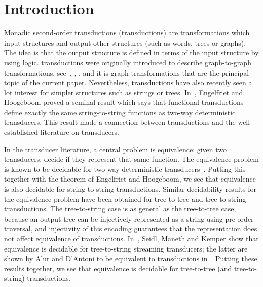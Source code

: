 \section{Introduction}
Monadic second-order transductions (\mso transductions) are transformations which input structures  and output other structures (such as words, trees or graphs). The idea is that the output structure is defined in terms of the input structure by using \mso logic. \mso transductions were originally introduced to describe graph-to-graph transformations, see~\cite[p.~43]{arnborgLagergrenSeese1988}, \cite[Definition 6]{engelfriet1991}, \cite[Defintion 2.2]{courcelle1991}, and it is graph transformations that are the principal topic of the current paper. Nevertheless, \mso transductions have also recently seen a lot interest for simpler structures such as strings or trees. In~\cite[Theorem 13]{engelfrietMSODefinableString2001},  Engelfriet and Hoogeboom proved a seminal result which says  that functional \mso transductions  define exactly the same string-to-string functions as two-way deterministic transducers. This result made a connection between \mso transductions and the well-established literature on transducers. 

In the transducer literature, a central problem is equivalence: given two transducers, decide if they represent that same function. The equivalence  problem  is known to be decidable for two-way deterministic transducers~\cite[Theorem 1]{gurariEquivalenceProblemDeterministic1982}. Putting this together with the theorem of Engelfriet and Hoogeboom, we see that  equivalence is also decidable for string-to-string \mso transductions.
Similar decidability results for the equivalence problem have been obtained  for tree-to-tree and tree-to-string transductions.  The tree-to-string case is as general as the tree-to-tree case, because an output tree can be  injectively represented as a string using pre-order traversal, and injectivity of this encoding guarantees that the representation does not affect equivalence of transductions. In~\cite[Corollary 8.2]{seidlManethKemper2018}, Seidl, Maneth and Kemper show that equivalence is decidable for tree-to-string streaming transducers; the latter are shown by Alur and D'Antoni to be equivalent to \mso transductions in~\cite[Theorem 4.6]{alurStreamingTreeTransducers2017}. Putting these results together, we see that equivalence is decidable for tree-to-tree (and tree-to-string) \mso transductions.

